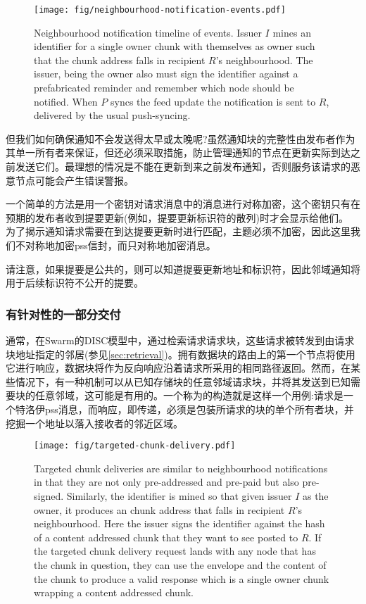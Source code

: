 \begin{figure}[htbp]
\centering
\texttt{[image: fig/neighbourhood-notification-events.pdf]}
\caption[Neighbourhood notification timeline of events \statusgreen]{Neighbourhood notification timeline of events. Issuer $I$ mines an identifier for a single owner chunk with themselves as owner such that the chunk address falls in recipient $R$'s neighbourhood. The issuer, being the owner also must sign the identifier against a prefabricated reminder and remember which node should be notified. When $P$ syncs the feed update the notification is sent to $R$, delivered by the usual push-syncing.}
\label{fig:neighbourhood-notification-events}
\end{figure}
  

但我们如何确保通知不会发送得太早或太晚呢?虽然通知块的完整性由发布者作为其单一所有者来保证，但还必须采取措施，防止管理通知的节点在更新实际到达之前发送它们。最理想的情况是不能在更新到来之前发布通知，否则服务该请求的恶意节点可能会产生错误警报。

一个简单的方法是用一个密钥对请求消息中的消息进行对称加密，这个密钥只有在预期的发布者收到提要更新(例如，提要更新标识符的散列)时才会显示给他们。
为了揭示通知请求需要在到达提要更新时进行匹配，主题必须不加密，因此这里我们不对称地加密pss信封，而只对称地加密消息。

请注意，如果提要是公共的，则可以知道提要更新地址和标识符，因此邻域通知将用于后续标识符不公开的提要。

\subsubsection{有针对性的一部分交付}

通常，在Swarm的DISC模型中，通过检索请求请求块，这些请求被转发到由请求块地址指定的邻居(参见\ref{sec:retrieval})。拥有数据块的路由上的第一个节点将使用它进行响应，数据块将作为反向响应沿着请求所采用的相同路径返回。然而，在某些情况下，有一种机制可以从已知存储块的任意邻域请求块，并将其发送到已知需要块的任意邻域，这可能是有用的。一个称为的构造就是这样一个用例:请求是一个特洛伊pss消息，而响应，即传递，必须是包装所请求的块的单个所有者块，并挖掘一个地址以落入接收者的邻近区域。  


\begin{figure}[htbp]
\centering
\texttt{[image: fig/targeted-chunk-delivery.pdf]}      
\caption[Targeted chunk deliveries \statusgreen]{Targeted chunk deliveries are similar to neighbourhood notifications in that they are not only pre-addressed and pre-paid but also pre-signed. Similarly, the identifier is mined so that given issuer $I$ as the owner, it produces an chunk address that falls in recipient $R$'s neighbourhood. Here the issuer signs the identifier against the hash of a content addressed chunk that they want to see posted to $R$. If the targeted chunk delivery request lands with any node that has the chunk in question, they can use the envelope and the content of the chunk to produce a valid response which is a single owner chunk wrapping a content addressed chunk.}
\label{fig:targeted-chunk-delivery}
\end{figure}

